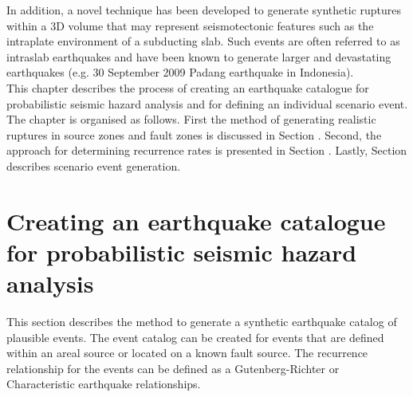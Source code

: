 In addition, a novel technique has been developed to generate synthetic ruptures within a 3D volume that may represent seismotectonic 
features such as the intraplate environment of a subducting slab. Such events are often referred to as intraslab earthquakes and have been known
to generate larger and devastating earthquakes (e.g. 30 September 2009 Padang earthquake in Indonesia). \\

This chapter describes the process of creating an earthquake catalogue for probabilistic seismic hazard 
analysis and for defining an individual scenario event. The chapter is organised as follows. First the 
method of generating realistic ruptures in source zones and fault zones is discussed in Section \label{sec:source-EQgeom}. Second, the approach for 
determining recurrence rates is presented in Section \label{sec:source-EQrec}. Lastly, Section \label{sec:source-scen} 
describes scenario event generation.

\section{Creating an earthquake catalogue for probabilistic seismic hazard analysis}%
\label{sec:source-EQcat}

This section describes the method to generate a synthetic earthquake catalog of plausible events. The event catalog can be
created for events that are defined within an areal source or located on a known fault source. The recurrence relationship for the events
can be defined as a Gutenberg-Richter or Characteristic earthquake relationships.

